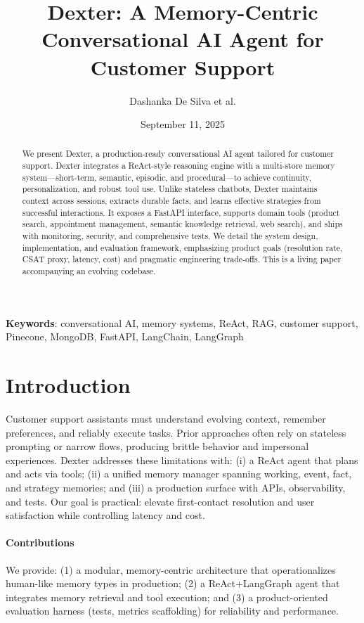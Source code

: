 \documentclass[11pt]{article}
\title{Dexter: A Memory-Centric Conversational AI Agent for Customer Support}
\author{Dashanka De Silva et al.}
\date{September 11, 2025}
\begin{document}
\maketitle

\begin{abstract}
We present Dexter, a production-ready conversational AI agent tailored for customer support. Dexter integrates a ReAct-style reasoning engine with a multi-store memory system---short-term, semantic, episodic, and procedural---to achieve continuity, personalization, and robust tool use. Unlike stateless chatbots, Dexter maintains context across sessions, extracts durable facts, and learns effective strategies from successful interactions. It exposes a FastAPI interface, supports domain tools (product search, appointment management, semantic knowledge retrieval, web search), and ships with monitoring, security, and comprehensive tests. We detail the system design, implementation, and evaluation framework, emphasizing product goals (resolution rate, CSAT proxy, latency, cost) and pragmatic engineering trade-offs. This is a living paper accompanying an evolving codebase.
\end{abstract}

\textbf{Keywords}: conversational AI, memory systems, ReAct, RAG, customer support, Pinecone, MongoDB, FastAPI, LangChain, LangGraph

\section{Introduction}
Customer support assistants must understand evolving context, remember preferences, and reliably execute tasks. Prior approaches often rely on stateless prompting or narrow flows, producing brittle behavior and impersonal experiences. Dexter addresses these limitations with: (i) a ReAct agent that plans and acts via tools; (ii) a unified memory manager spanning working, event, fact, and strategy memories; and (iii) a production surface with APIs, observability, and tests. Our goal is practical: elevate first-contact resolution and user satisfaction while controlling latency and cost.

\paragraph{Contributions} We provide: (1) a modular, memory-centric architecture that operationalizes human-like memory types in production; (2) a ReAct+LangGraph agent that integrates memory retrieval and tool execution; and (3) a product-oriented evaluation harness (tests, metrics scaffolding) for reliability and performance.
\end{document}
